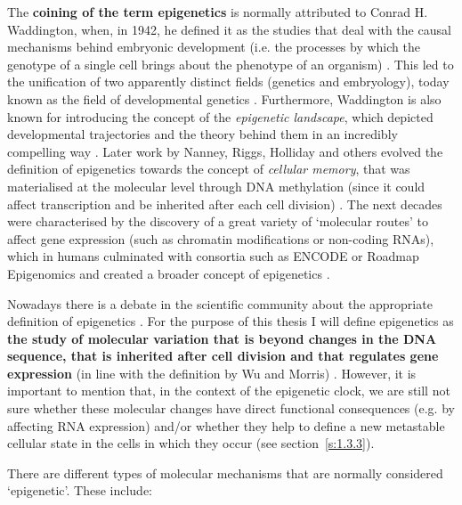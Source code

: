 \smallskip

The \textbf{coining of the term epigenetics} is normally attributed to Conrad H. Waddington, when, in 1942, he defined it as the studies that deal with the causal mechanisms behind embryonic development (i.e. the processes by which the genotype of a single cell brings about the phenotype of an organism) \cite{Waddington1942}. This led to the unification of two apparently distinct fields (genetics and embryology), today known as the field of developmental genetics \cite{Gilbert2011}. Furthermore, Waddington is also known for introducing the concept of the \textit{epigenetic landscape}, which depicted developmental trajectories and the theory behind them in an incredibly compelling way \cite{Waddington1957}. Later work by Nanney, Riggs, Holliday and others evolved the definition of epigenetics towards the concept of \textit{cellular memory}, that was materialised at the molecular level through DNA methylation (since it could affect transcription and be inherited after each cell division) \cite{Lappalainen2017}. The next decades were characterised by the discovery of a great variety of `molecular routes' to affect gene expression (such as chromatin modifications or non-coding RNAs), which in humans culminated with consortia such as ENCODE \cite{Consortium2012} or Roadmap Epigenomics \cite{Consortium2015} and created a broader concept of epigenetics \cite{Lappalainen2017,Greally2018}.

\bigskip

Nowadays there is a debate in the scientific community about the appropriate definition of epigenetics \cite{Greally2018,Bird2007}. For the purpose of this thesis I will define epigenetics as \textbf{the study of molecular variation that is beyond changes in the DNA sequence, that is inherited after cell division and that regulates gene expression} (in line with the definition by Wu and Morris) \cite{Wu2001}. However, it is important to mention that, in the context of the epigenetic clock, we are still not sure whether these molecular changes have direct functional consequences (e.g. by affecting RNA expression) and/or whether they help to define a new metastable cellular state in the cells in which they occur (see section~\ref{s:1.3.3}).

\bigskip

There are different types of molecular mechanisms that are normally considered `epigenetic'. These include:


